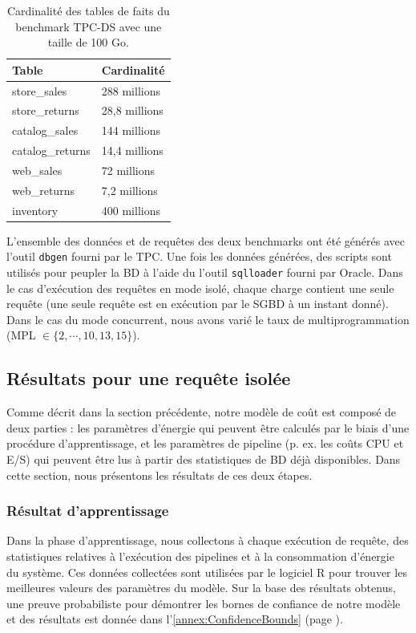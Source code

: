 \begin{table}[]
\centering
\caption {Cardinalité des tables de faits du benchmark TPC-DS avec une taille de 100 Go.}\label{tab:tpcds-table-rows}
\begin{tabular}{ll}
\toprule
\textbf{Table} & \textbf{Cardinalité} \\ \midrule
	store\_sales & 288 millions \\ 
	store\_returns & 28,8 millions \\ 
	catalog\_sales & 144 millions \\
	catalog\_returns & 14,4 millions \\
	web\_sales & 72 millions \\
	web\_returns & 7,2 millions \\
	inventory & 400 millions \\ \bottomrule
\end{tabular}
\end{table}

L'ensemble des données et de requêtes des deux benchmarks ont été générés avec l'outil \texttt{dbgen} fourni par le TPC. Une fois les données générées, des scripts sont utilisés pour peupler la BD à l'aide du l'outil \texttt{sqlloader} fourni par Oracle.
Dans le cas d'exécution des requêtes en mode isolé, chaque charge contient une seule requête (une seule requête est en exécution par le SGBD à un instant donné).
Dans le cas du mode concurrent, nous avons varié le taux de multiprogrammation (MPL $\in \{2,\cdots,10,13,15\}$).

\subsection{Résultats pour une requête isolée}
Comme décrit dans la section précédente, notre modèle de coût est composé de deux parties : les paramètres d'énergie qui peuvent être calculés par le biais d'une procédure d'apprentissage, et les paramètres de pipeline (p. ex. les coûts CPU et E/S) qui peuvent être lus à partir des statistiques de BD déjà disponibles. Dans cette section, nous présentons les résultats de ces deux étapes.

\subsubsection{Résultat d'apprentissage}
Dans la phase d'apprentissage, nous collectons à chaque exécution de requête, des statistiques relatives à l'exécution des pipelines et à la consommation d'énergie du système. Ces données collectées sont utilisées par le logiciel R pour trouver les meilleures valeurs des paramètres du modèle. Sur la base des résultats obtenus, une preuve probabiliste pour démontrer les bornes de confiance de notre modèle et des résultats est donnée dans l'\ref{annex:ConfidenceBounds} (page \pageref{annex:ConfidenceBounds}).

